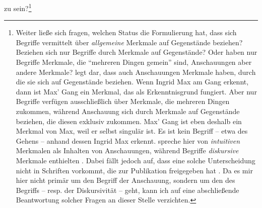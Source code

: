 zu sein?\footnote{Weiter ließe sich fragen, welchen Status die Formulierung hat, dass sich
Begriffe vermittelt über \emph{allgemeine} Merkmale auf Gegenstände beziehen? Beziehen sich nur
Begriffe durch Merkmale auf Gegenstände? Oder haben nur Begriffe Merkmale, die
\enquote{mehreren Dingen gemein} sind, Anschauungen aber andere Merkmale?
 legt dar, dass auch Anschauungen
Merkmale haben, durch die sie sich auf Gegenstände beziehen. Wenn Ingrid Max am
Gang erkennt, dann ist Max' Gang ein Merkmal, das als Erkenntnisgrund fungiert.
Aber nur Begriffe verfügen ausschließlich über Merkmale, die mehreren Dingen
zukommen, während Anschauung sich durch Merkmale auf Gegenstände beziehen, die
diesen exklusiv zukommen. Max' Gang ist eben deshalb ein Merkmal von Max, weil
er selbst singulär ist. Es ist kein Begriff -- etwa des Gehens -- anhand dessen
Ingrid Max erkennt.  spreche hier von \emph{intuitiven}
Merkmalen als Inhalten von Anschauungen, während Begriffe \emph{diskursive}
Merkmale enthielten \parencite[vgl.][65--71]{Gruene:BlindeAnschauung2009}. Dabei
fällt jedoch auf, dass eine solche Unterscheidung nicht in Schriften vorkommt,
die  zur Publikation freigegeben hat
\parencite[vgl.][62]{Prien:KantsLogikderBegriffe2006}. Da es mir hier nicht
primär um den Begriff der Anschauung, sondern um den des Begriffs -- resp. der
Diskursivität -- geht, kann ich auf eine abschließende Beantwortung solcher
Fragen an dieser Stelle verzichten.}


